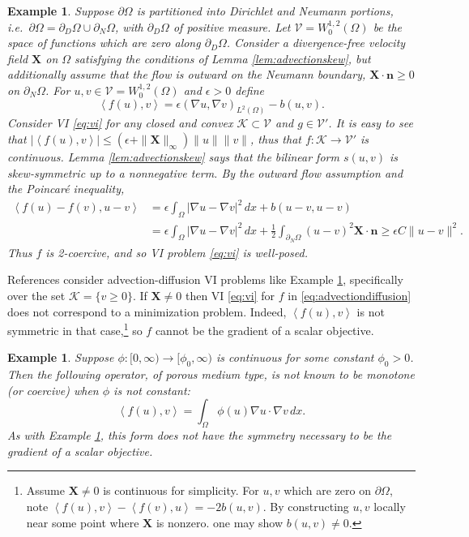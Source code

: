 \documentclass[letterpaper,final,12pt,reqno]{amsart}
\theoremstyle{cstyle}
\theoremstyle{cstyle*}
\theoremstyle{dstyle}
\newtheorem{example}[theorem]{Example}
\numberwithin{equation}{section}
\numberwithin{figure}{section}
\numberwithin{table}{section}
\numberwithin{theorem}{section}
\newcommand{\eps}{\epsilon}
\newcommand{\grad}{\nabla}
\newcommand{\bn}{\mathbf{n}}
\newcommand{\bX}{\mathbf{X}}
\newcommand{\cK}{\mathcal{K}}
\newcommand{\cV}{\mathcal{V}}
\newcommand{\ip}[2]{\left<#1,#2\right>}
\begin{document}
\begin{example}  \label{ex:advectiondiffusion}  Suppose $\partial\Omega$ is partitioned into Dirichlet and Neumann portions, i.e.~$\partial\Omega = \partial_D\Omega \cup \partial_N\Omega$, with $\partial_D\Omega$ of positive measure.  Let $\cV = W_0^{1,2}(\Omega)$ be the space of functions which are zero along $\partial_D\Omega$.  Consider a divergence-free velocity field $\bX$ on $\Omega$ satisfying the conditions of Lemma \ref{lem:advectionskew}, but additionally assume that the flow is outward on the Neumann boundary, $\bX \cdot \bn \ge 0$ on $\partial_N\Omega$.  For $u,v \in \cV = W_0^{1,2}(\Omega)$ and $\eps>0$ define
\begin{equation}
\ip{f(u)}{v} = \eps \left(\grad u, \grad v\right)_{L^2(\Omega)} - b(u,v). \label{eq:advectiondiffusion}
\end{equation}
Consider VI \eqref{eq:vi} for any closed and convex $\cK \subset \cV$ and $g\in\cV'$.  It is easy to see that $|\ip{f(u)}{v}| \le (\eps + \|\bX\|_\infty) \|u\| \|v\|$, thus that $f:\cK \to \cV'$ is continuous.  Lemma \ref{lem:advectionskew} says that the bilinear form $s(u,v)$ is skew-symmetric up to a nonnegative term.  By the outward flow assumption and the Poincar\'e inequality,
\begin{align*}
\ip{f(u)-f(v)}{u-v} &= \eps \int_\Omega |\grad u - \grad v|^2\,dx + b(u-v,u-v) \\
                    &= \eps \int_\Omega |\grad u - \grad v|^2\,dx + \frac{1}{2} \int_{\partial_N\Omega} (u-v)^2 \bX\cdot\bn \ge \eps C \|u-v\|^2.
\end{align*}
Thus $f$ is 2-coercive, and so VI problem \eqref{eq:vi} is well-posed.
\end{example}

References \cite{Bueler2021conservation,ChangNakshatrala2017} consider advection-diffusion VI problems like Example \ref{ex:advectiondiffusion}, specifically over the set $\cK = \{v\ge 0\}$.  If $\bX \ne 0$ then VI \eqref{eq:vi} for $f$ in \eqref{eq:advectiondiffusion} does not correspond to a minimization problem.  Indeed, $\ip{f(u)}{v}$ is not symmetric in that case,\footnote{Assume $\bX \ne 0$ is continuous for simplicity.  For $u,v$ which are zero on $\partial \Omega$, note $\ip{f(u)}{v} - \ip{f(v)}{u} = -2 b(u,v)$.  By constructing $u,v$ locally near some point where $\bX$ is nonzero. one may show $b(u,v)\ne 0$.} so $f$ cannot be the gradient of a scalar objective.

\begin{example}  \label{ex:porous}  Suppose $\phi:[0,\infty) \to [\phi_0,\infty)$ is continuous for some constant $\phi_0>0$.  Then the following operator, of porous medium type, is not known to be monotone (or coercive) when $\phi$ is not constant:
\begin{equation}
\ip{f(u)}{v} = \int_\Omega \phi(u) \grad u \cdot \grad v\,dx. \label{eq:porous}
\end{equation}
As with Example \ref{ex:advectiondiffusion}, this form does not have the symmetry necessary to be the gradient of a scalar objective.
\end{example}
\end{document}
